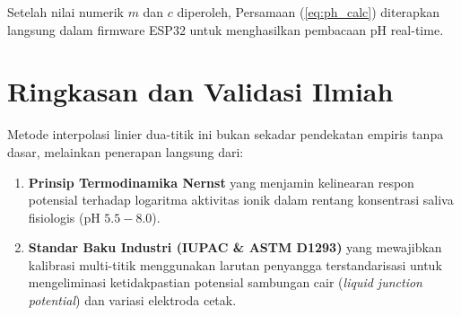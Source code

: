 \documentclass[12pt,a4paper]{article}
\begin{document}
Setelah nilai numerik $m$ dan $c$ diperoleh, Persamaan (\ref{eq:ph_calc}) diterapkan langsung dalam firmware ESP32 untuk menghasilkan pembacaan pH real-time.

\section{Ringkasan dan Validasi Ilmiah}

Metode interpolasi linier dua-titik ini bukan sekadar pendekatan empiris tanpa dasar, melainkan penerapan langsung dari:
\begin{enumerate}
    \item \textbf{Prinsip Termodinamika Nernst} yang menjamin kelinearan respon potensial terhadap logaritma aktivitas ionik dalam rentang konsentrasi saliva fisiologis ($\text{pH } 5.5 - 8.0$).
    \item \textbf{Standar Baku Industri (IUPAC \& ASTM D1293)} yang mewajibkan kalibrasi multi-titik menggunakan larutan penyangga terstandarisasi untuk mengeliminasi ketidakpastian potensial sambungan cair (\textit{liquid junction potential}) dan variasi elektroda cetak.
\end{enumerate}
\end{document}
